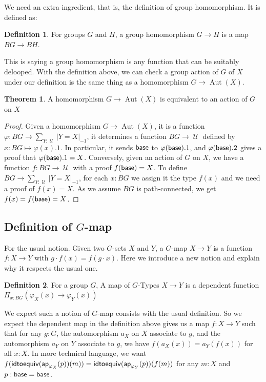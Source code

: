 \documentclass[11pt]{article}
\DeclareMathOperator{\cu}{\mathcal U}
\DeclareMathOperator{\Aut}{Aut}
\DeclareMathOperator{\base}{\sf base}
\DeclareMathOperator{\ap}{\sf ap}
\DeclareMathOperator{\idtoequiv}{\sf idtoequiv}
\theoremstyle{definition}
\newtheorem{definition}{Definition}[section]
\newtheorem{theorem}{Theorem}[section]
\begin{document}
We need an extra ingredient, that is, the definition of group homomorphism. It is defined as:

\begin{definition}
    For groups $G$ and $H$, a group homomorphism $G\to H$ is a map $BG\to BH$. 
\end{definition}

This is saying a group homomorphism is any function that can be suitably delooped. With the definition above, we can check a group action of $G$ of $X$ under our definition is the same thing as a homomorphism $G\to \Aut(X)$.

\begin{theorem}
    A homomorphism $G\to \Aut (X)$ is equivalent to an action of $G$ on $X$
\end{theorem}
\begin{proof}
    Given a homomorphism $G\to \Aut(X)$, it is a function $\varphi:BG\to \sum_{Y:\cu}|Y=X|_{-1}$, it determines a function $BG\to \cu$ defined by $x:BG\mapsto \varphi(x).1$. In particular, it sends $\base$ to $\varphi(\base).1$, and $\varphi(\base).2$ gives a proof that $\varphi(\base).1 = X$. Conversely, given an action of $G$ on $X$, we have a function $f:BG\to \cu$ with a proof $f(\base)= X$. To define $BG\to \sum_{Y:\cu}|Y=X|_{-1}$, for each $x:BG$ we assign it the type $f(x)$ and we need a proof of $f(x)=X$. As we assume $BG$ is path-connected, we get $f(x)=f(\base) = X$. 
\end{proof}


\subsection{Definition of $G$-map}

For the usual notion. Given two $G$-sets $X$ and $Y$, a $G$-map $X\to Y$ is a function $f:X\to Y$ with $g\cdot f(x)=f(g\cdot x)$. Here we introduce a new notion and explain why it respects the usual one.

\begin{definition}
    For a group $G$, A map of $G$-Types $X\to Y$ is a dependent function $\Pi_{x:BG}(\varphi_X(x)\to \varphi_Y(x))$
\end{definition}

We expect such a notion of $G$-map consists with the usual definition. So we expect the dependent map in the definition above gives us a map $f:X\to Y$ such that for any $g:G$, the automorphism $a_X$ on $X$ associate to $g$, and the automorphism $a_Y$ on $Y$ associate to $g$, we have $f(a_X(x))=a_Y(f(x))$ for all $x:X$. In more technical language, we want $f(\idtoequiv(\ap_{\varphi_X}(p))(m))=\idtoequiv(\ap_{\varphi_Y}(p))(f(m))$ for any $m:X$ and $p:\base =\base$.
\end{document}

